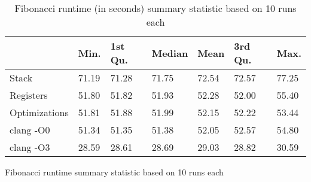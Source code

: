 \begin{table}[h!]
\centering
\begin{tabular}{p{}p{}p{}p{}p{}p{}p{}}
  \hline
 & Min. & 1st Qu. & Median & Mean & 3rd Qu. & Max. \\ 
  \hline
Stack & 71.19 & 71.28 & 71.75 & 72.54 & 72.57 & 77.25 \\ 
  Registers & 51.80 & 51.82 & 51.93 & 52.28 & 52.00 & 55.40 \\ 
  Optimizations & 51.81 & 51.88 & 51.99 & 52.15 & 52.22 & 53.44 \\ 
  clang -O0 & 51.34 & 51.35 & 51.38 & 52.05 & 52.57 & 54.80 \\ 
  clang -O3 & 28.59 & 28.61 & 28.69 & 29.03 & 28.82 & 30.59 \\ 
   \hline
\end{tabular}
\caption{Fibonacci runtime summary statistic based on 10 runs each}
\caption{Fibonacci runtime (in seconds) summary statistic based on 10 runs each}
\end{table}
